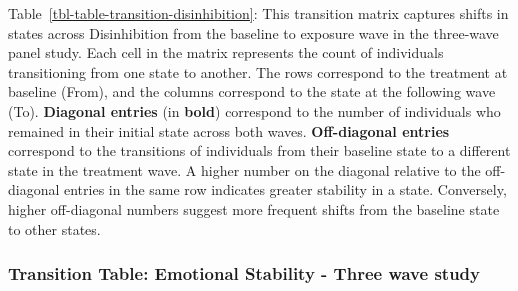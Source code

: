 \documentclass[
  single column]{article}
\begin{document}
Table~\ref{tbl-table-transition-disinhibition}: This transition matrix
captures shifts in states across Disinhibition from the baseline to
exposure wave in the three-wave panel study. Each cell in the matrix
represents the count of individuals transitioning from one state to
another. The rows correspond to the treatment at baseline (From), and
the columns correspond to the state at the following wave (To).
\textbf{Diagonal entries} (in \textbf{bold}) correspond to the number of
individuals who remained in their initial state across both waves.
\textbf{Off-diagonal entries} correspond to the transitions of
individuals from their baseline state to a different state in the
treatment wave. A higher number on the diagonal relative to the
off-diagonal entries in the same row indicates greater stability in a
state. Conversely, higher off-diagonal numbers suggest more frequent
shifts from the baseline state to other states.

\subsubsection{Transition Table: Emotional Stability - Three wave
study}\label{transition-table-emotional-stability---three-wave-study}
\end{document}
